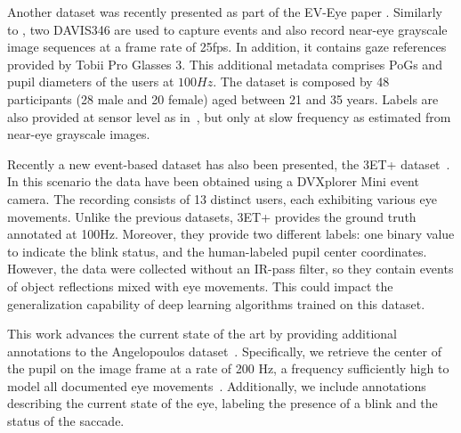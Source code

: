 Another dataset was recently presented as part of the EV-Eye paper \cite{eveyepaper}. Similarly to \cite{angelopoulos2020event}, two DAVIS346 are used to capture events and also record near-eye grayscale image sequences at a frame rate of 25fps. In addition, it contains gaze references provided by Tobii Pro Glasses 3. This additional metadata comprises PoGs and pupil diameters of the users at $100Hz$. The dataset is composed by 48 participants (28 male and 20 female) aged between 21 and 35 years. Labels are also provided at sensor level as in~\cite{bonazzi2024retina}, but only at slow frequency as estimated from near-eye grayscale images.


Recently a new event-based dataset has also been presented, the 3ET+ dataset~\cite{wang2024eventbasedeyetrackingais}. In this scenario the data have been obtained using a DVXplorer Mini event camera. The recording consists of 13 distinct users, each exhibiting various eye movements. Unlike the previous datasets, 3ET+ provides the ground truth annotated at 100Hz. Moreover, they provide two different labels: one binary value to indicate the blink status, and the human-labeled pupil center coordinates. However, the data were collected without an IR-pass filter, so they contain events of object reflections mixed with eye movements. This could impact the generalization capability of deep learning algorithms trained on this dataset.

This work advances the current state of the art by providing additional annotations to the Angelopoulos dataset~\cite{angelopoulos2020event}. Specifically, we retrieve the center of the pupil on the image frame at a rate of 200 Hz, a frequency sufficiently high to model all documented eye movements~\cite{holmqvist_eye_movements}. Additionally, we include annotations describing the current state of the eye, labeling the presence of a blink and the status of the saccade.

